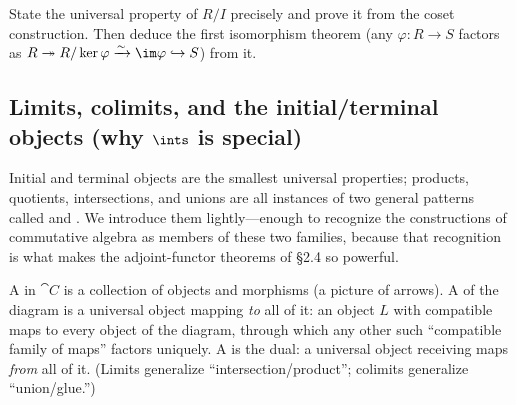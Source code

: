 \documentclass[11pt]{article}
\begin{document}
\begin{xca}
State the universal property of $R/I$ precisely and prove it from the coset construction.
Then deduce the first isomorphism theorem (any $\varphi\colon R\to S$ factors as
$R\twoheadrightarrow R/\ker\varphi\xrightarrow{\sim}\im\varphi\hookrightarrow S$) from it.
\end{xca}

\subsection{Limits, colimits, and the initial/terminal objects (why \texorpdfstring{$\ints$}{Z} is special)}

Initial and terminal objects are the smallest universal properties; products, quotients,
intersections, and unions are all instances of two general patterns called  and
. We introduce them lightly---enough to recognize the constructions of
commutative algebra as members of these two families, because that recognition is what makes
the adjoint-functor theorems of \S2.4 so powerful.

\begin{ddefinition}
A  in $\cat{C}$ is a collection of objects and morphisms (a picture of arrows).
A  of the diagram is a universal object mapping \emph{to} all of it: an object
$L$ with compatible maps to every object of the diagram, through which any other such
``compatible family of maps'' factors uniquely. A  is the dual: a universal
object receiving maps \emph{from} all of it. (Limits generalize ``intersection/product''; colimits
generalize ``union/glue.'')
\end{ddefinition}
\end{document}
